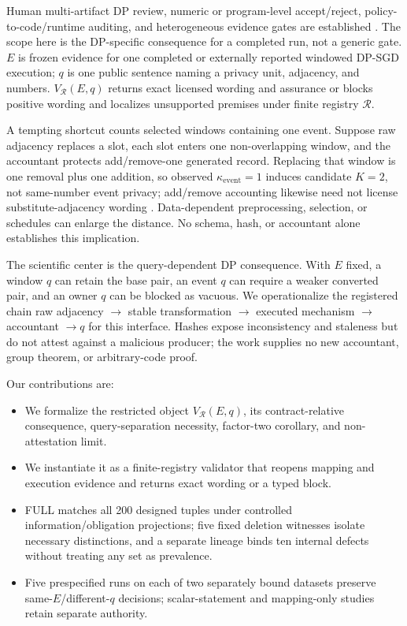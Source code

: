 \documentclass[letterpaper]{article} %
\newcommand{\ke}{\kappa_{\mathrm{event}}}
\begin{document}
Human multi-artifact DP review, numeric or program-level accept/reject, policy-to-code/runtime auditing, and heterogeneous evidence gates are established \citep{ridgeway2021challenge,wang2023randomized,winogradcort2017adaptive,zhang2026priagent,muhammad2026audit}. The scope here is the DP-specific consequence for a completed run, not a generic gate. $E$ is frozen evidence for one completed or externally reported windowed DP-SGD execution; $q$ is one public sentence naming a privacy unit, adjacency, and numbers. $V_{\mathcal R}(E,q)$ returns exact licensed wording and assurance or blocks positive wording and localizes unsupported premises under finite registry $\mathcal R$.

A tempting shortcut counts selected windows containing one event. Suppose raw adjacency replaces a slot, each slot enters one non-overlapping window, and the accountant protects add/remove-one generated record. Replacing that window is one removal plus one addition, so observed $\ke=1$ induces candidate $K=2$, not same-number event privacy; add/remove accounting likewise need not license substitute-adjacency wording \citep{pradhan2026beyond}. Data-dependent preprocessing, selection, or schedules can enlarge the distance. No schema, hash, or accountant alone establishes this implication.

The scientific center is the query-dependent DP consequence. With $E$ fixed, a window $q$ can retain the base pair, an event $q$ can require a weaker converted pair, and an owner $q$ can be blocked as vacuous. We operationalize the registered chain raw adjacency $\rightarrow$ stable transformation $\rightarrow$ executed mechanism $\rightarrow$ accountant $\rightarrow q$ for this interface. Hashes expose inconsistency and staleness but do not attest against a malicious producer; the work supplies no new accountant, group theorem, or arbitrary-code proof.

Our contributions are:
\begin{itemize}
\item We formalize the restricted object $V_{\mathcal R}(E,q)$, its contract-relative consequence, query-separation necessity, factor-two corollary, and non-attestation limit.
\item We instantiate it as a finite-registry validator that reopens mapping and execution evidence and returns exact wording or a typed block.
\item FULL matches all 200 designed tuples under controlled information/obligation projections; five fixed deletion witnesses isolate necessary distinctions, and a separate lineage binds ten internal defects without treating any set as prevalence.
\item Five prespecified runs on each of two separately bound datasets preserve same-$E$/different-$q$ decisions; scalar-statement and mapping-only studies retain separate authority.
\end{itemize}
\end{document}
